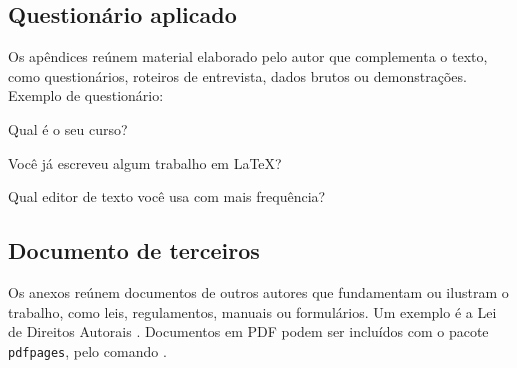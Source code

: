 \documentclass[
	12pt, %
	openright, %
	oneside, %
	a4paper, %
	sumario=tradicional, %
	english, %
	brazil, %
]{abntex2}
\begin{document}
\imprimirreferencias

\begin{apendicesenv}
	\partapendices

	\chapter{Questionário aplicado}\label{apendice:questionario}

	Os apêndices reúnem material elaborado pelo autor que complementa o texto, como questionários, roteiros de entrevista, dados brutos ou demonstrações. Exemplo de questionário:

	\begin{alineas}
		\item Qual é o seu curso?
		\item Você já escreveu algum trabalho em \LaTeX?
		\item Qual editor de texto você usa com mais frequência?
	\end{alineas}
\end{apendicesenv}
\begin{anexosenv}
	\partanexos

	\chapter{Documento de terceiros}\label{anexo:lei}

	Os anexos reúnem documentos de outros autores que fundamentam ou ilustram o trabalho, como leis, regulamentos, manuais ou formulários. Um exemplo é a Lei de Direitos Autorais \cite{brasil1998}. Documentos em PDF podem ser incluídos com o pacote \texttt{pdfpages}, pelo comando \verb||.
\end{anexosenv}
 
\end{document}
